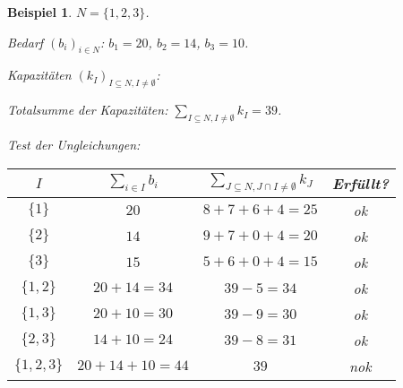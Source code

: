 \documentclass{article}
\newtheorem{example}{Beispiel}
\begin{document}
		
	\begin{example}
		$N=\{1, 2, 3\}$.
		
		Bedarf $(b_i)_{i\in N}$: $b_1 = 20$, $b_2 = 14$, $b_3 = 10$.
		
		Kapazitäten $(k_I)_{I\subseteq N, I\neq \emptyset}$:
		\begin{center}
		\end{center}
		
		
		Totalsumme der Kapazitäten: $\sum_{I\subseteq N, I \neq \emptyset}k_I = 39$.

		Test der Ungleichungen:
		\begin{center}
			\begin{tabular}{|c|c|c|c|}
				\hline
				$I$ & $\sum_{i \in I}b_i$ & $\sum_{J\subseteq N, J\cap I \neq \emptyset}k_J$ & Erfüllt? \\ \hline
				$\{1\}$ & $20$ & $8+7+6+4=25$ & ok \\ \hline
				$\{2\}$ & $14$ & $9+7+0+4=20$ & ok \\ \hline
				$\{3\}$ & $15$ & $5+6+0+4=15$ & ok \\ \hline
				$\{1,2\}$ & $20+14=34$ & $39-5=34$ & ok \\ \hline
				$\{1,3\}$ & $20+10=30$ & $39-9=30$ & ok \\ \hline
				$\{2,3\}$ & $14+10=24$ & $39-8=31$ & ok \\ \hline
				$\{1,2,3\}$ & $20+14+10=44$ & $39$ & nok \\ \hline
			\end{tabular}
		\end{center}
	\end{example}
\end{document}
